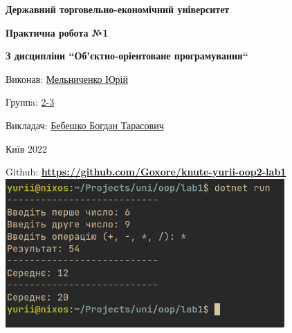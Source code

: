 \documentclass{article}
\begin{document}
\begin{titlepage}
    \begin{center}
        \Large\textbf{Державний торговельно-економічний університет}\\
        \vspace{2.5 em}

        \large\textbf{Практична робота №1}\\
        \vspace{1 em}

        \large\textbf{З дисципліни ``Об'єктно-оріентоване програмування``}\\
        \vspace{1 em}

    \end{center}
    \vspace{3.5 em}

    Виконав: \underline{Мельниченко Юрій}\\
    \vspace{-0.3 em}

    Группa: \underline{2-3}\\
    \vspace{-0.3 em}

    Викладач: \underline{Бебешко Богдан Тарасович}\\

    \vfill

    \begin{center}
        Київ 2022
    \end{center}
\end{titlepage}

\noindent
Github: \textbf{\href{https://github.com/Goxore/knute-yurii-oop2-lab1}{https://github.com/Goxore/knute-yurii-oop2-lab1}} \\

\includegraphics[width=0.8\textwidth]{img/2023-02-17-18-39-39.png}
\end{document}
